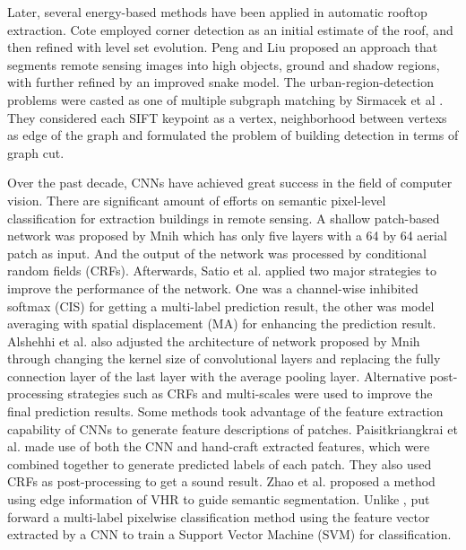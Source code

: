\setlength{\parindent}{2ex}Later, several energy-based methods have been applied in automatic rooftop extraction. Cote \cite{IEEEexample:cote2013automatic} employed corner detection as an initial estimate of the roof, and then refined with level set evolution. Peng and Liu \cite{IEEEexample:peng2005improved} proposed an approach that segments remote sensing images into high objects, ground and shadow regions, with further refined by an improved snake model. The urban-region-detection problems were casted as one of multiple subgraph matching by Sirmacek et al \cite{IEEEexample:sirmacek2009urban}. They considered each SIFT keypoint as a vertex, neighborhood between vertexs as edge of the graph and formulated the problem of building detection in terms of graph cut.\par
\setlength{\parindent}{2ex}Over the past decade, CNNs have achieved great success in the field of computer vision. There are significant amount of efforts on semantic pixel-level classification for extraction buildings in remote sensing. A shallow patch-based network was proposed by Mnih \cite{IEEEexample:mnih2013machine} which has only five layers with a 64 by 64 aerial patch as input. And the output of the network was processed by conditional random fields (CRFs). Afterwards, Satio et al.\cite{IEEEexample:saito2016multiple} applied two major strategies to improve the performance of the network. One was a channel-wise inhibited softmax (CIS) for getting a multi-label prediction result, the other was model averaging with spatial displacement (MA) for enhancing the prediction result. Alshehhi et al. \cite{IEEEexample:alshehhi2017simultaneous} also adjusted the architecture of network proposed by Mnih through changing the kernel size of convolutional layers and replacing the fully connection layer of the last layer with the average pooling layer. Alternative post-processing strategies such as CRFs and multi-scales were used to improve the final prediction results. Some methods took advantage of the feature extraction capability of CNNs to generate feature descriptions of patches. Paisitkriangkrai et al. \cite{IEEEexample:paisitkriangkrai2015effective} made use of both the CNN and hand-craft extracted features, which were combined together to generate predicted labels of each patch. They also used CRFs as post-processing to get a sound result. Zhao et al. \cite{IEEEexample:zhao2017contextually} proposed a method using edge information of VHR to guide semantic segmentation. Unlike \cite{IEEEexample:paisitkriangkrai2015effective}, \cite{IEEEexample:he2017multi} put forward a multi-label pixelwise classification method using the feature vector extracted by a CNN to train a Support Vector Machine (SVM) for classification.\par
